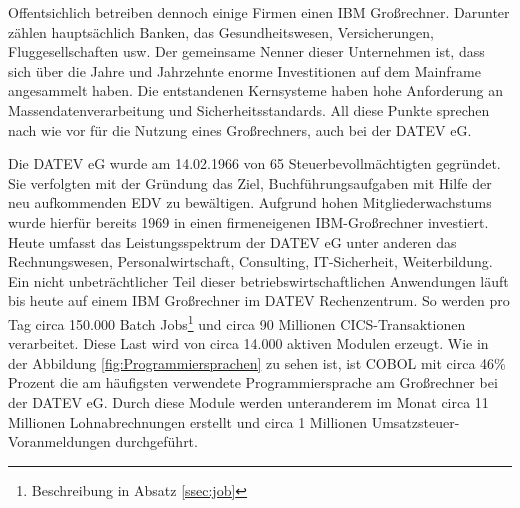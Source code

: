 Offentsichlich betreiben dennoch einige Firmen einen IBM Großrechner.
Darunter zählen hauptsächlich Banken, das Gesundheitswesen, Versicherungen, Fluggesellschaften usw.
Der gemeinsame Nenner dieser Unternehmen ist, dass sich über die Jahre und Jahrzehnte enorme Investitionen auf dem Mainframe angesammelt haben. Die entstandenen Kernsysteme haben hohe Anforderung an Massendatenverarbeitung und Sicherheitsstandards.
All diese Punkte sprechen nach wie vor für die Nutzung eines Großrechners, auch bei der DATEV eG.
\cite{IBM.2014}

Die DATEV eG wurde am 14.02.1966 von 65 Steuerbevollmächtigten gegründet.
Sie verfolgten mit der Gründung das Ziel, Buchführungsaufgaben mit Hilfe der neu aufkommenden EDV zu bewältigen.
Aufgrund hohen Mitgliederwachstums wurde hierfür bereits 1969 in einen firmeneigenen IBM-Großrechner investiert.\cite{DATEVeG.2017}
Heute umfasst das Leistungsspektrum der DATEV eG unter anderen das Rechnungswesen, Personalwirtschaft, Consulting, IT-Sicherheit, Weiterbildung.
Ein nicht unbeträchtlicher Teil dieser betriebswirtschaftlichen Anwendungen läuft bis heute auf einem IBM Großrechner im DATEV Rechenzentrum.
So werden pro Tag circa 150.000 Batch Jobs\footnote{Beschreibung in Absatz \ref{ssec:job}} und circa 90 Millionen CICS-Transaktionen verarbeitet.
Diese Last wird von circa 14.000 aktiven Modulen erzeugt.
Wie in der Abbildung \ref{fig:Programmiersprachen} zu sehen ist, ist COBOL mit circa 46\% Prozent die am häufigsten verwendete Programmiersprache am Großrechner bei der DATEV eG.
Durch diese Module werden unteranderem im Monat circa 11 Millionen Lohnabrechnungen erstellt und circa 1 Millionen Umsatzsteuer-Voranmeldungen durchgeführt.

